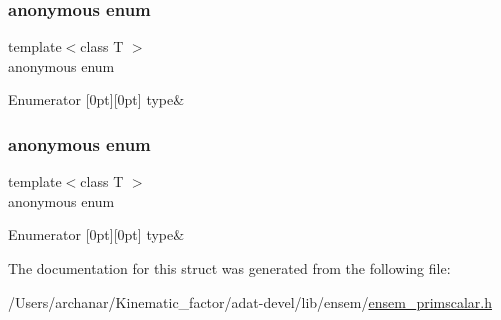 \subsubsection{\texorpdfstring{anonymous enum}{anonymous enum}}
{\footnotesize\ttfamily template$<$class T $>$ \\
anonymous enum}

\begin{DoxyEnumFields}{Enumerator}
[0pt][0pt]{}\mbox{\label{structENSEM_1_1EnsbcIO_3_01PScalar_3_01T_01_4_01_4_a4bfcfcf59e4d4638f8afc7ba98dc93baadebfddcd965322a309c382c575cb6970}} 
type&\\
\hline

\end{DoxyEnumFields}
\mbox{\label{structENSEM_1_1EnsbcIO_3_01PScalar_3_01T_01_4_01_4_a4bfcfcf59e4d4638f8afc7ba98dc93ba}} 
\subsubsection{\texorpdfstring{anonymous enum}{anonymous enum}}
{\footnotesize\ttfamily template$<$class T $>$ \\
anonymous enum}

\begin{DoxyEnumFields}{Enumerator}
[0pt][0pt]{}\mbox{\label{structENSEM_1_1EnsbcIO_3_01PScalar_3_01T_01_4_01_4_a4bfcfcf59e4d4638f8afc7ba98dc93baadebfddcd965322a309c382c575cb6970}} 
type&\\
\hline

\end{DoxyEnumFields}


The documentation for this struct was generated from the following file\+:\begin{DoxyCompactItemize}
\item 
/\+Users/archanar/\+Kinematic\+\_\+factor/adat-\/devel/lib/ensem/\mbox{\hyperlink{adat-devel_2lib_2ensem_2ensem__primscalar_8h}{ensem\+\_\+primscalar.\+h}}\end{DoxyCompactItemize}
